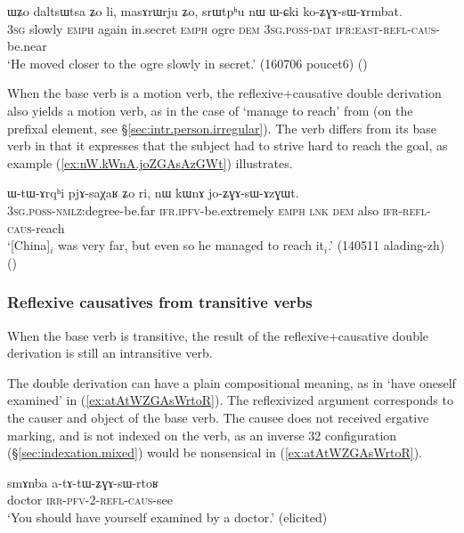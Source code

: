 \begin{exe}
\ex \label{ex:WCki.koZGAsArmbat}
\gll ɯʑo daltsɯtsa ʑo li, masɤrɯrju ʑo, srɯtpʰu nɯ ɯ-ɕki ko-ʑɣɤ-sɯ-ɤrmbat. \\
\textsc{3sg} slowly \textsc{emph} again in.secret \textsc{emph} ogre \textsc{dem} \textsc{3sg}.\textsc{poss}-\textsc{dat} \textsc{ifr}:\textsc{east}-\textsc{refl}-\textsc{caus}-be.near \\
\glt `He moved closer to the ogre slowly in secret.'  (160706 poucet6)
()
\end{exe}

   
When the base verb is a motion verb, the reflexive+causative double derivation also yields a motion verb, as in the case of   `manage to reach' from  (on the  prefixal element, see §\ref{sec:intr.person.irregular}). The verb  differs from its base verb in that it expresses that the subject  had to strive hard to reach the goal, as example (\ref{ex:nW.kWnA.joZGAsAzGWt}) illustrates.

\begin{exe}
\ex \label{ex:nW.kWnA.joZGAsAzGWt}
\gll ɯ-tɯ-ɤrqʰi pjɤ-saχaʁ ʑo ri, nɯ kɯnɤ jo-ʑɣɤ-sɯ-ɤzɣɯt. \\
\textsc{3sg}.\textsc{poss}-\textsc{nmlz}:degree-be.far \textsc{ifr}.\textsc{ipfv}-be.extremely \textsc{emph} \textsc{lnk} \textsc{dem} also \textsc{ifr}-\textsc{refl}-\textsc{caus}-reach \\
\glt `[China]$_i$ was very far, but even so he managed to reach it$_i$.' (140511 alading-zh) ()
\end{exe}
\subsubsection{Reflexive  causatives from transitive verbs}
When the base verb is transitive, the result of the reflexive+causative double derivation is still an intransitive verb. 

The double derivation can have a plain compositional meaning, as in  `have oneself examined' in (\ref{ex:atAtWZGAsWrtoR}). The reflexivized argument corresponds to the causer and object of the base verb. The causee  does not received ergative marking, and is not indexed on the verb, as an inverse 3\fl{}2 configuration (§\ref{sec:indexation.mixed}) would be nonsensical in (\ref{ex:atAtWZGAsWrtoR}).


\begin{exe}
\ex \label{ex:atAtWZGAsWrtoR}
\gll smɤnba a-tɤ-tɯ-ʑɣɤ-sɯ-rtoʁ \\
doctor \textsc{irr}-\textsc{pfv}-2-\textsc{refl}-\textsc{caus}-see \\
\glt `You should have yourself examined by a doctor.' (elicited)
\end{exe}

